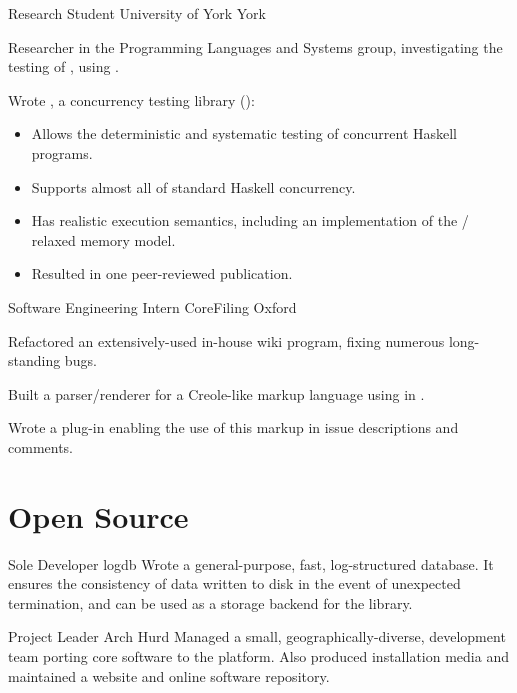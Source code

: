 \documentclass[a4paper]{barrucadu-cv}
\begin{document}
  {Research Student}
  {University of York}
  {York}
  {\begin{tightitemize}
    \item Researcher in the Programming Languages and Systems group,
      investigating the testing of ,
      using .
    \item Wrote , a concurrency testing library
      (\textbf{}):
      \begin{itemize}
      \item Allows the deterministic and systematic testing of
        concurrent Haskell programs.
      \item Supports almost all of standard Haskell concurrency.
      \item Has realistic execution semantics, including an
        implementation of the  / 
        relaxed memory model.
      \item Resulted in one peer-reviewed publication.
      \end{itemize}
    \end{tightitemize}}

  {Software Engineering Intern}
  {CoreFiling}
  {Oxford}
  {\begin{tightitemize}
    \item Refactored an extensively-used in-house wiki program, fixing
      numerous long-standing bugs.
    \item Built a parser/renderer for a Creole-like markup language
      using  in .
    \item Wrote a  plug-in enabling the use of this
      markup in issue descriptions and comments.
    \end{tightitemize}}

\section{Open Source}

  {Sole Developer}
  {logdb}
  {}
  {Wrote a  general-purpose, fast, log-structured
    database. It ensures the consistency of data written to disk in
    the event of unexpected termination, and can be used as a storage
    backend for the  library.}

  {Project Leader}
  {Arch Hurd}
  {}
  {Managed a small, geographically-diverse, development team porting
    core  software to the  platform.
    Also produced installation media and maintained a website and
    online software repository.}
\end{document}
